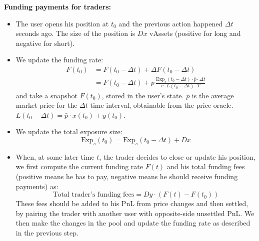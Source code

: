 \documentclass{article}
\begin{document}
\medskip
\noindent\textbf{Funding payments for traders:}
\begin{itemize}

\item The user opens his position at $t_0$ and the previous action happened $\Delta t$
      seconds ago. The size of the position is $Dx$ vAssets (positive for long and negative
      for short).

\item We update the funding rate:
\begin{align}
F(t_0) &= F(t_0 - \Delta t) + \Delta F(t_0 - \Delta t) \label{F update}\\
        &= F(t_0 - \Delta t) + \bar{p}\,\frac{\mathrm{Exp}_s(t_0 - \Delta t) \cdot \bar{p} \cdot \Delta t}{c \cdot L(t_0 - \Delta t) \cdot T} \label{F update2}
\end{align}
and take a snapshot $F(t_0)$, stored in the user's state. $\bar{p}$ is the average market
price for the $\Delta t$ time interval, obtainable from the price oracle.
$L(t_0 - \Delta t) = \bar{p} \cdot x(t_0) + y(t_0)$.

\item We update the total exposure size:
\begin{equation}
\mathrm{Exp}_s(t_0) = \mathrm{Exp}_s(t_0 - \Delta t) + Dx \label{Exp update}
\end{equation}

\item When, at some later time $t$, the trader decides to close or update his position, we
first compute the current funding rate $F(t)$ and his total funding fees (positive means he
has to pay, negative means he should receive funding payments) as:
\begin{equation}
\text{Total trader's funding fees} = Dy \cdot (F(t) - F(t_0))
\end{equation}
These fees should be added to his PnL from price changes and then settled, by pairing the
trader with another user with opposite-side unsettled PnL. We then make the changes in the
pool and update the funding rate as described in the previous step.

\end{itemize}
\end{document}
